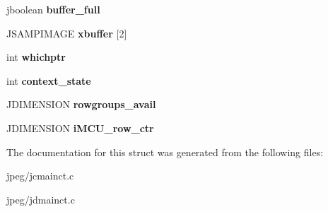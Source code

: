 \begin{DoxyCompactItemize}
\item 
jboolean {\bfseries buffer\+\_\+full}\hypertarget{structmy__main__controller_ab7eb421412e09757a797e420f593af79}{}\label{structmy__main__controller_ab7eb421412e09757a797e420f593af79}

\item 
J\+S\+A\+M\+P\+I\+M\+A\+GE {\bfseries xbuffer} \mbox{[}2\mbox{]}\hypertarget{structmy__main__controller_a29fc35521c04489fdb6b7a7e758fb82a}{}\label{structmy__main__controller_a29fc35521c04489fdb6b7a7e758fb82a}

\item 
int {\bfseries whichptr}\hypertarget{structmy__main__controller_a9838025ca47813221e8c208ad26bb9e8}{}\label{structmy__main__controller_a9838025ca47813221e8c208ad26bb9e8}

\item 
int {\bfseries context\+\_\+state}\hypertarget{structmy__main__controller_abc90e17934b16420478e95a8875918ae}{}\label{structmy__main__controller_abc90e17934b16420478e95a8875918ae}

\item 
J\+D\+I\+M\+E\+N\+S\+I\+ON {\bfseries rowgroups\+\_\+avail}\hypertarget{structmy__main__controller_a8fdc8a382fc0be7922e5913b16cbf7dc}{}\label{structmy__main__controller_a8fdc8a382fc0be7922e5913b16cbf7dc}

\item 
J\+D\+I\+M\+E\+N\+S\+I\+ON {\bfseries i\+M\+C\+U\+\_\+row\+\_\+ctr}\hypertarget{structmy__main__controller_a01c8f176e423a5d8e37637fa8210b236}{}\label{structmy__main__controller_a01c8f176e423a5d8e37637fa8210b236}

\end{DoxyCompactItemize}


The documentation for this struct was generated from the following files\+:\begin{DoxyCompactItemize}
\item 
jpeg/jcmainct.\+c\item 
jpeg/jdmainct.\+c\end{DoxyCompactItemize}
